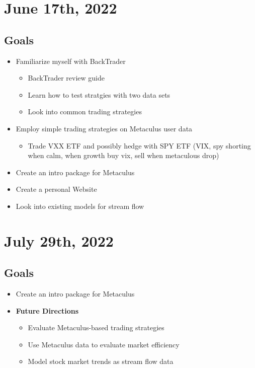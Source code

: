 \documentclass{article}
\begin{document}
\section{June 17th, 2022}
\subsection*{Goals}
\begin{itemize}
    \item Familiarize myself with BackTrader
    \begin{itemize}
        \item BackTrader review guide
        \item Learn how to test stratgies with two data sets
        \item Look into common trading strategies
    \end{itemize}
    \item Employ simple trading strategies on Metaculus user data 
    \begin{itemize}
        \item Trade VXX ETF and possibly hedge with SPY ETF (VIX, spy shorting when calm, when growth buy vix, sell when metaculous drop)
    \end{itemize}
    \item Create an intro package for Metaculus
    \item Create a personal Website
    \item Look into existing models for stream flow
\end{itemize}

\section{July 29th, 2022}
\subsection*{Goals}
\begin{itemize}
    \item Create an intro package for Metaculus
    \item \textbf{Future Directions}
    \begin{itemize}
        \item Evaluate Metaculus-based trading strategies
        \item Use Metaculus data to evaluate market efficiency
        \item Model stock market trends as stream flow data
    \end{itemize}

\end{itemize}
\end{document}
